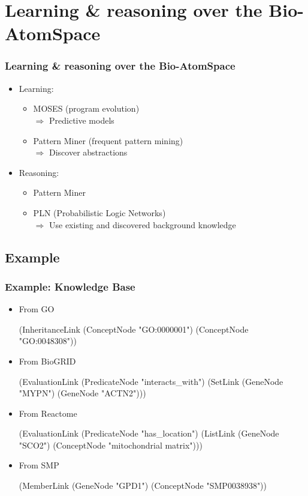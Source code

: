 \documentclass[aspectratio=169]{beamer}
\begin{document}
\section{Learning \& reasoning over the Bio-AtomSpace}

\begin{frame}
  \frametitle{Learning \& reasoning over the Bio-AtomSpace}

  \begin{itemize}
  \item Learning:\\
    \begin{itemize}
    \item MOSES (program evolution)\\
      $\Rightarrow$ \alert{Predictive models}
    \item Pattern Miner (frequent pattern mining)\\
      $\Rightarrow$ \alert{Discover abstractions}
    \end{itemize}
  \item Reasoning:\\
    \begin{itemize}
    \item Pattern Miner
    \item PLN (Probabilistic Logic Networks)\\
      $\Rightarrow$ \alert{Use existing and discovered background knowledge}
    \end{itemize}
  \end{itemize}
  
\end{frame}

\subsection{Example}

\begin{frame}[fragile]
  \frametitle{Example: Knowledge Base}
  \begin{itemize}
  \item From GO
    {\tiny \begin{semiverbatim}
(InheritanceLink
  (ConceptNode "GO:0000001")
  (ConceptNode "GO:0048308"))
    \end{semiverbatim}}
  \item From BioGRID
    {\tiny \begin{semiverbatim}
(EvaluationLink
  (PredicateNode "interacts_with")
  (SetLink 
    (GeneNode "MYPN")
    (GeneNode "ACTN2")))
    \end{semiverbatim}}
  \item From Reactome
    {\tiny \begin{semiverbatim}
(EvaluationLink
  (PredicateNode "has_location")
  (ListLink
    (GeneNode "SCO2")
    (ConceptNode "mitochondrial matrix")))
    \end{semiverbatim}}
  \item From SMP
    {\tiny \begin{semiverbatim}
(MemberLink 
  (GeneNode "GPD1")
  (ConceptNode "SMP0038938"))
    \end{semiverbatim}}
  \end{itemize}
\end{frame}
\end{document}
